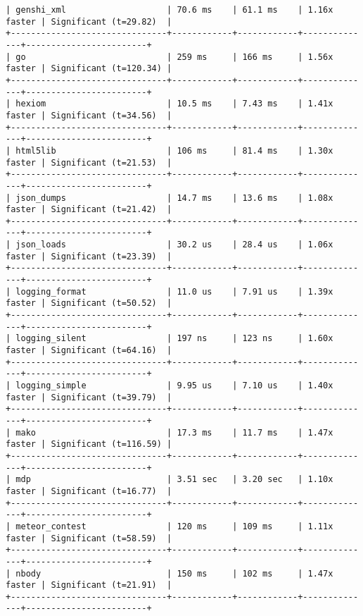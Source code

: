 \begin{code}
\begin{verbatim}
| genshi_xml                    | 70.6 ms    | 61.1 ms    | 1.16x faster | Significant (t=29.82)  |
+-------------------------------+------------+------------+--------------+------------------------+
| go                            | 259 ms     | 166 ms     | 1.56x faster | Significant (t=120.34) |
+-------------------------------+------------+------------+--------------+------------------------+
| hexiom                        | 10.5 ms    | 7.43 ms    | 1.41x faster | Significant (t=34.56)  |
+-------------------------------+------------+------------+--------------+------------------------+
| html5lib                      | 106 ms     | 81.4 ms    | 1.30x faster | Significant (t=21.53)  |
+-------------------------------+------------+------------+--------------+------------------------+
| json_dumps                    | 14.7 ms    | 13.6 ms    | 1.08x faster | Significant (t=21.42)  |
+-------------------------------+------------+------------+--------------+------------------------+
| json_loads                    | 30.2 us    | 28.4 us    | 1.06x faster | Significant (t=23.39)  |
+-------------------------------+------------+------------+--------------+------------------------+
| logging_format                | 11.0 us    | 7.91 us    | 1.39x faster | Significant (t=50.52)  |
+-------------------------------+------------+------------+--------------+------------------------+
| logging_silent                | 197 ns     | 123 ns     | 1.60x faster | Significant (t=64.16)  |
+-------------------------------+------------+------------+--------------+------------------------+
| logging_simple                | 9.95 us    | 7.10 us    | 1.40x faster | Significant (t=39.79)  |
+-------------------------------+------------+------------+--------------+------------------------+
| mako                          | 17.3 ms    | 11.7 ms    | 1.47x faster | Significant (t=116.59) |
+-------------------------------+------------+------------+--------------+------------------------+
| mdp                           | 3.51 sec   | 3.20 sec   | 1.10x faster | Significant (t=16.77)  |
+-------------------------------+------------+------------+--------------+------------------------+
| meteor_contest                | 120 ms     | 109 ms     | 1.11x faster | Significant (t=58.59)  |
+-------------------------------+------------+------------+--------------+------------------------+
| nbody                         | 150 ms     | 102 ms     | 1.47x faster | Significant (t=21.91)  |
+-------------------------------+------------+------------+--------------+------------------------+

\end{verbatim}
\end{code}
